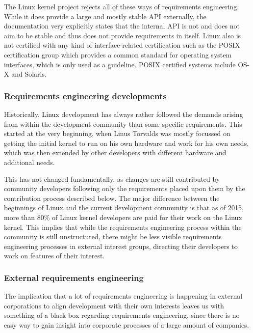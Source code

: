\documentclass{sig-alternate-05-2015}
\begin{document}
The Linux kernel project rejects all of these ways of requirements engineering.
While it does provide a large and mostly stable API externally, the documentation very explicitly states that the internal API is not and does not aim to be stable and thus does not provide requirements in itself.
Linux also is not certified with any kind of interface-related certification such as the POSIX certification group which provides a common standard for operating system interfaces, which is only used as a guideline. POSIX certified systems include OS-X and Solaris.

\subsubsection{Requirements engineering developments}

Historically, Linux development has always rather followed the demands arising from within the development community than some specific requirements.
This started at the very beginning, when Linus Torvalds was mostly focussed on getting the initial kernel to run on his own hardware and work for his own needs, which was then extended by other developers with different hardware and additional needs.

This has not changed fundamentally, as changes are still contributed by community developers following only the requirements placed upon them by the contribution process described below.
The major difference between the beginnings of Linux and the current development community is that as of 2015, more than \(80\%\) of Linux kernel developers are paid for their work on the Linux kernel\cite{corbet2015linux}.
This implies that while the requirements engineering process within the community is still unstructured, there might be less visible requirements engineering processes in external interest groups, directing their developers to work on features of their interest.

\subsubsection{External requirements engineering}

The implication that a lot of requirements engineering is happening in external corporations to align development with their own interests leaves us with something of a black box regarding requirements engineering, since there is no easy way to gain insight into corporate processes of a large amount of companies.
\end{document}
